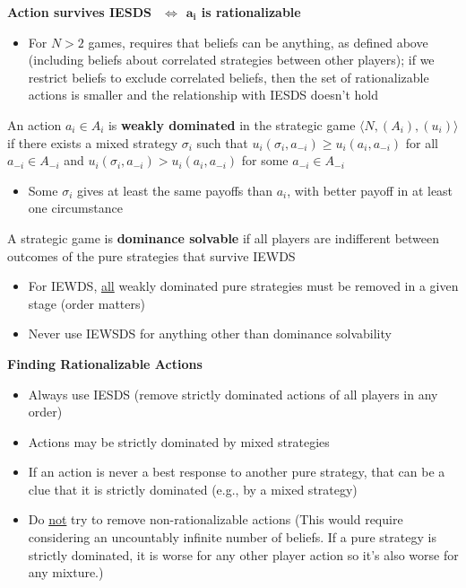 \documentclass{report}
\newcommand{\FlowerSmall}{\mbox{\raisebox{-1pt}{\small\EightFlowerPetalRemoved}}} %
\begin{document}
\textbf{Action  survives IESDS $\hspace{5pt} \Leftrightarrow \hspace{5pt} \boldsymbol{a_i}$ is rationalizable}
\begin{itemize}
	\item{For $N>2$ games, requires that beliefs can be anything, as defined above (including beliefs about correlated strategies between other players); if we restrict beliefs to exclude correlated beliefs, then the set of rationalizable actions is smaller and the relationship with IESDS doesn't hold}
\end{itemize}
\bigskip 

An action $a_i \in A_i$ is \textbf{weakly dominated} in the strategic game $\langle N,(A_i),(u_i) \rangle$ if there exists a mixed strategy $\sigma_i$ such that $u_i(\sigma_i,a_{-i}) \geq u_i(a_i,a_{-i})$ for all $a_{-i} \in A_{-i}$ and $u_i(\sigma_i,a_{-i}) > u_i(a_i,a_{-i})$ for some $a_{-i} \in A_{-i}$
\begin{itemize}
	\item{Some $\sigma_i$ gives at least the same payoffs than $a_i$, with better payoff in at least one circumstance}
	\end{itemize}
\bigskip

A strategic game is \textbf{dominance solvable} if all players are indifferent between outcomes of the pure strategies that survive IEWDS
\begin{itemize}
	\item{For IEWDS, \underline{all} weakly dominated pure strategies must be removed in a given stage (order matters)}
	\item{Never use IEWSDS for anything other than dominance solvability}
\end{itemize}

\medskip
\begin{mdframed}
	\medskip
	\begin{center} \textbf{{\large Finding Rationalizable Actions}} \end{center}
	\begin{itemize}[label=\FlowerSmall]
		\item{Always use IESDS (remove strictly dominated actions of all players in any order)}
		\item{Actions may be strictly dominated by mixed strategies}
		\item{If an action is never a best response to another pure strategy, that can be a clue that it is strictly dominated (e.g., by a mixed strategy)}
		\item{Do \underline{not} try to remove non-rationalizable actions (This would require considering an uncountably infinite number of beliefs. If a pure strategy is strictly dominated, it is worse for any other player action so it's also worse for any mixture.)}
	\end{itemize}
	\smallskip
\end{mdframed}
\newpage
\end{document}
